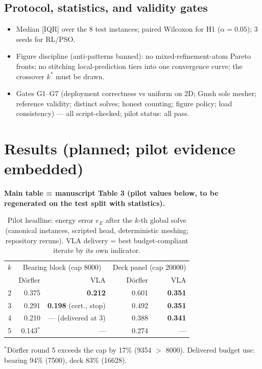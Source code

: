 \documentclass[preprint,12pt]{elsarticle}
\newcommand{\eE}{e_{E}}
\newenvironment{plan}{\begin{itemize}\setlength\itemsep{0.15em}}{\end{itemize}}
\begin{document}
\subsection{Protocol, statistics, and validity gates}
\begin{plan}
  \item Median [IQR] over the 8 test instances; paired Wilcoxon for H1
        ($\alpha=0.05$); 3 seeds for RL/PSO.
  \item Figure discipline (anti-patterns banned): no mixed-refinement-atom Pareto
        fronts; no stitching local-prediction tiers into one convergence curve; the
        crossover $k^*$ must be drawn.
  \item Gates G1--G7 (deployment correctness vs uniform on 2D; Gmsh sole mesher;
        reference validity; distinct solves; honest counting; figure policy; load
        consistency) --- all script-checked; pilot status: all pass.
\end{plan}

\section{Results (planned; pilot evidence embedded)}\label{sec:results}
\textbf{Main table = manuscript Table 3 (pilot values below, to be regenerated on the
test split with statistics).}

\begin{table}[h]\centering
\caption{Pilot headline: energy error $\eE$ after the $k$-th global solve (canonical
instances, scripted head, deterministic meshing; repository reruns). VLA delivery =
best budget-compliant iterate by its own indicator.}\label{tab:headline}
\begin{tabular}{crrrr}
\toprule
$k$ & \multicolumn{2}{c}{Bearing block (cap 8000)} &
      \multicolumn{2}{c}{Deck panel (cap 20000)} \\
    & D\"orfler & VLA & D\"orfler & VLA \\
\midrule
2 & 0.375 & \textbf{0.212} & 0.601 & \textbf{0.351} \\
3 & 0.291 & \textbf{0.198} (cert., stop) & 0.492 & \textbf{0.351} \\
4 & 0.210 & --- (delivered at 3) & 0.388 & \textbf{0.341} \\
5 & 0.143$^{\ast}$ & --- & 0.274 & --- \\
\bottomrule
\end{tabular}

\smallskip\small $^{\ast}$D\"orfler round 5 exceeds the cap by 17\% (9354 $>$ 8000).
Delivered budget use: bearing 94\% (7500), deck 83\% (16628).
\end{table}
\end{document}
